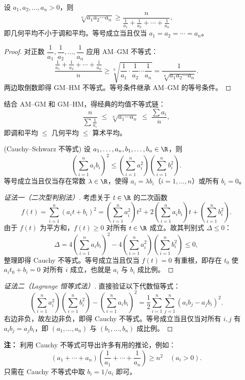 \begin{proposition}[GM--HM 不等式]
	设 $a_1, a_2, \dots, a_n > 0$，则
	\[
	\sqrt[n]{a_1 a_2 \cdots a_n} \geqslant \frac{n}{\frac{1}{a_1} + \frac{1}{a_2} + \cdots + \frac{1}{a_n}},
	\]
	即几何平均不小于调和平均。等号成立当且仅当 $a_1 = a_2 = \cdots = a_n$。
\end{proposition}

\begin{proof}
	对正数 $\dfrac{1}{a_1}, \dfrac{1}{a_2}, \dots, \dfrac{1}{a_n}$ 应用 AM--GM 不等式：
	\[
	\frac{\frac{1}{a_1} + \frac{1}{a_2} + \cdots + \frac{1}{a_n}}{n}
	\geqslant \sqrt[n]{\frac{1}{a_1} \cdot \frac{1}{a_2} \cdots \frac{1}{a_n}}
	= \frac{1}{\sqrt[n]{a_1 a_2 \cdots a_n}}.
	\]
	两边取倒数即得 GM--HM 不等式。等号条件继承 AM--GM 的等号条件。
\end{proof}

\noindent 结合 AM--GM 和 GM--HM，得经典的均值不等式链：
\[
\frac{n}{\sum \frac{1}{a_i}} \;\leqslant\; \sqrt[n]{a_1\cdots a_n} \;\leqslant\; \frac{\sum a_i}{n},
\]
即调和平均 $\leqslant$ 几何平均 $\leqslant$ 算术平均。


\begin{proposition}(Cauchy--Schwarz 不等式)
	设 $a_1,\dots,a_n, b_1,\dots,b_n \in \R$，则
	\[
	\left(\sum_{i=1}^{n} a_i b_i\right)^2 \leqslant \left(\sum_{i=1}^{n} a_i^2\right)\left(\sum_{i=1}^{n} b_i^2\right).
	\]
	等号成立当且仅当存在常数 $\lambda \in \R$，使得 $a_i = \lambda b_i$（$i=1,\dots,n$）或所有 $b_i = 0$。
\end{proposition}

\begin{proof}[证法一（二次型判别法）]
	考虑关于 $t \in \R$ 的二次函数
	\[
	f(t) = \sum_{i=1}^{n} (a_i t + b_i)^2 = \left(\sum_{i=1}^{n} a_i^2\right) t^2 + 2\left(\sum_{i=1}^{n} a_i b_i\right) t + \left(\sum_{i=1}^{n} b_i^2\right).
	\]
	由于 $f(t)$ 为平方和，$f(t) \geqslant 0$ 对所有 $t \in \R$ 成立。故其判别式 $\Delta \leqslant 0$：
	\[
	\Delta = 4\left(\sum_{i=1}^{n} a_i b_i\right)^2 - 4\left(\sum_{i=1}^{n} a_i^2\right)\left(\sum_{i=1}^{n} b_i^2\right) \leqslant 0,
	\]
	整理即得 Cauchy 不等式。等号成立当且仅当 $f(t)=0$ 有重根，即存在 $t_0$ 使 $a_i t_0 + b_i = 0$ 对所有 $i$ 成立，也就是 $a_i$ 与 $b_i$ 成比例。
\end{proof}

\begin{proof}[证法二（Lagrange 恒等式法）]
	直接验证以下代数恒等式：
	\[
	\left(\sum_{i=1}^{n} a_i^2\right)\left(\sum_{i=1}^{n} b_i^2\right) - \left(\sum_{i=1}^{n} a_i b_i\right)^2
	= \frac{1}{2}\sum_{i=1}^{n}\sum_{j=1}^{n} (a_i b_j - a_j b_i)^2.
	\]
	右边非负，故左边非负，即得 Cauchy 不等式。等号成立当且仅当对所有 $i,j$ 有 $a_i b_j = a_j b_i$，即 $(a_1,\dots,a_n)$ 与 $(b_1,\dots,b_n)$ 成比例。
\end{proof}

\textbf{注：}
利用 Cauchy 不等式可导出许多有用的推论，例如：
	\[
	(a_1+\cdots+a_n)\left(\frac{1}{a_1}+\cdots+\frac{1}{a_n}\right) \geqslant n^2 \quad (a_i > 0).
	\]
	只需在 Cauchy 不等式中取 $b_i = 1/a_i$ 即可。


